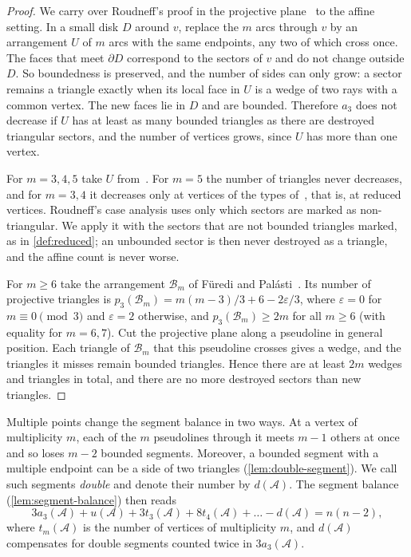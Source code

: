 \begin{proof}
We carry over Roudneff's proof in the projective plane~\cite[\S3]{roudneff96} to the affine setting.
In a small disk $D$ around $v$, replace the $m$ arcs through $v$ by an arrangement $U$ of $m$ arcs with the same endpoints, any two of which cross once.
The faces that meet $\partial D$ correspond to the sectors of $v$ and do not change outside $D$. So boundedness is preserved, and the number of sides can only grow: a sector remains a triangle exactly when its local face in $U$ is a wedge of two rays with a common vertex.
The new faces lie in $D$ and are bounded.
Therefore $a_3$ does not decrease if $U$ has at least as many bounded triangles as there are destroyed triangular sectors, and the number of vertices grows, since $U$ has more than one vertex.

For $m=3,4,5$ take $U$ from~\cite[Fig.~3.3, 3.4, 3.1]{roudneff96}. For $m=5$ the number of triangles never decreases, and for $m=3,4$ it decreases only at vertices of the types of~\cite[Fig.~3.5]{roudneff96}, that is, at reduced vertices.
Roudneff's case analysis uses only which sectors are marked as non-triangular.
We apply it with the sectors that are not bounded triangles marked, as in \cref{def:reduced}; an unbounded sector is then never destroyed as a triangle, and the affine count is never worse.

For $m\ge6$ take the arrangement $\mathcal B_m$ of F\"uredi and Pal\'asti~\cite[Example~2, Property~3]{fp84}. Its number of projective triangles is $p_3(\mathcal B_m)=m(m-3)/3+6-2\varepsilon/3$, where $\varepsilon=0$ for $m\equiv0\pmod3$ and $\varepsilon=2$ otherwise, and $p_3(\mathcal B_m)\ge2m$ for all $m\ge6$ (with equality for $m=6,7$).
Cut the projective plane along a pseudoline in general position. Each triangle of $\mathcal B_m$ that this pseudoline crosses gives a wedge, and the triangles it misses remain bounded triangles.
Hence there are at least $2m$ wedges and triangles in total, and there are no more destroyed sectors than new triangles.
\end{proof}

Multiple points change the segment balance in two ways. At a vertex of multiplicity $m$, each of the $m$ pseudolines through it meets $m-1$ others at once and so loses $m-2$ bounded segments. Moreover, a bounded segment with a multiple endpoint can be a side of two triangles (\cref{lem:double-segment}). We call such segments \emph{double} and denote their number by $d(\mathcal{A})$. The segment balance (\cref{lem:segment-balance}) then reads
\begin{equation}\label{eq:non-simple-segm}
3a_3(\mathcal{A})+u(\mathcal{A})+3t_3(\mathcal{A})+8t_4(\mathcal{A})+\ldots-d(\mathcal{A})=n(n-2),
\end{equation}
where $t_m(\mathcal{A})$ is the number of vertices of multiplicity $m$, and $d(\mathcal{A})$ compensates for double segments counted twice in $3a_3(\mathcal{A})$.


